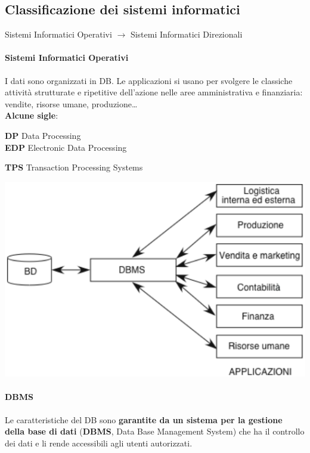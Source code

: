 \documentclass[10pt]{book}
\begin{document}
\subsection{Classificazione dei sistemi informatici}
\begin{center}
Sistemi Informatici Operativi $\longrightarrow$ Sistemi Informatici Direzionali
\end{center}
\begin{multicols}{2}
\paragraph{Sistemi Informatici Operativi} I dati sono organizzati in DB. Le applicazioni si usano per svolgere le classiche attività strutturate e ripetitive dell'azione nelle aree amministrativa e finanziaria: vendite, risorse umane, produzione\ldots\\
\textbf{Alcune sigle}:
\begin{list}{}{}
	\item \textbf{DP} Data Processing\\\textbf{EDP} Electronic Data Processing
	\item \textbf{TPS} Transaction Processing Systems
\end{list}
\begin{center}
	\includegraphics[scale=0.6]{sisinfop.png}
\end{center}
\paragraph{DBMS} Le caratteristiche del DB sono \textbf{garantite da un sistema per la gestione della base di dati} (\textbf{DBMS}, Data Base Management System) che ha il controllo dei dati e li rende accessibili agli utenti autorizzati.

\end{multicols}
\end{document}
